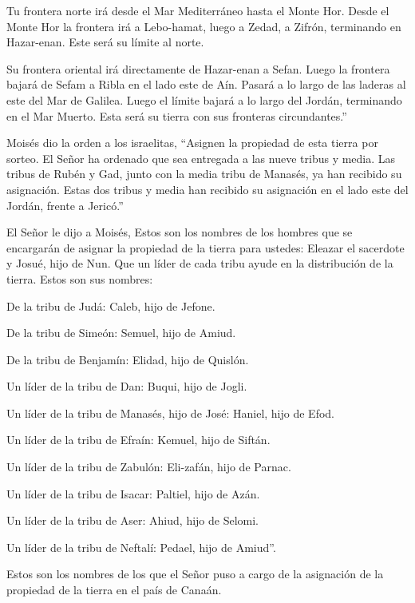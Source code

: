  Tu frontera norte irá desde el Mar Mediterráneo hasta el
Monte Hor.  Desde el Monte Hor la frontera irá a Lebo-hamat,
luego a Zedad,  a Zifrón, terminando en Hazar-enan. Este
será su límite al norte.

 Su frontera oriental irá directamente de Hazar-enan a
Sefan.  Luego la frontera bajará de Sefam a Ribla en el
lado este de Aín. Pasará a lo largo de las laderas al este del Mar de
Galilea.  Luego el límite bajará a lo largo del Jordán,
terminando en el Mar Muerto. Esta será su tierra con sus fronteras
circundantes.''

 Moisés dio la orden a los israelitas, ``Asignen la
propiedad de esta tierra por sorteo. El Señor ha ordenado que sea
entregada a las nueve tribus y media.  Las tribus de Rubén
y Gad, junto con la media tribu de Manasés, ya han recibido su
asignación.  Estas dos tribus y media han recibido su
asignación en el lado este del Jordán, frente a Jericó.''

 El Señor le dijo a Moisés,  Estos son los
nombres de los hombres que se encargarán de asignar la propiedad de la
tierra para ustedes: Eleazar el sacerdote y Josué, hijo de Nun.
 Que un líder de cada tribu ayude en la distribución de la
tierra.  Estos son sus nombres:

De la tribu de Judá: Caleb, hijo de Jefone.

 De la tribu de Simeón: Semuel, hijo de Amiud.

 De la tribu de Benjamín: Elidad, hijo de Quislón.

 Un líder de la tribu de Dan: Buqui, hijo de Jogli.

 Un líder de la tribu de Manasés, hijo de José: Haniel,
hijo de Efod.

 Un líder de la tribu de Efraín: Kemuel, hijo de Siftán.

 Un líder de la tribu de Zabulón: Eli-zafán, hijo de
Parnac.

 Un líder de la tribu de Isacar: Paltiel, hijo de Azán.

 Un líder de la tribu de Aser: Ahiud, hijo de Selomi.

 Un líder de la tribu de Neftalí: Pedael, hijo de Amiud''.

 Estos son los nombres de los que el Señor puso a cargo de
la asignación de la propiedad de la tierra en el país de Canaán.


